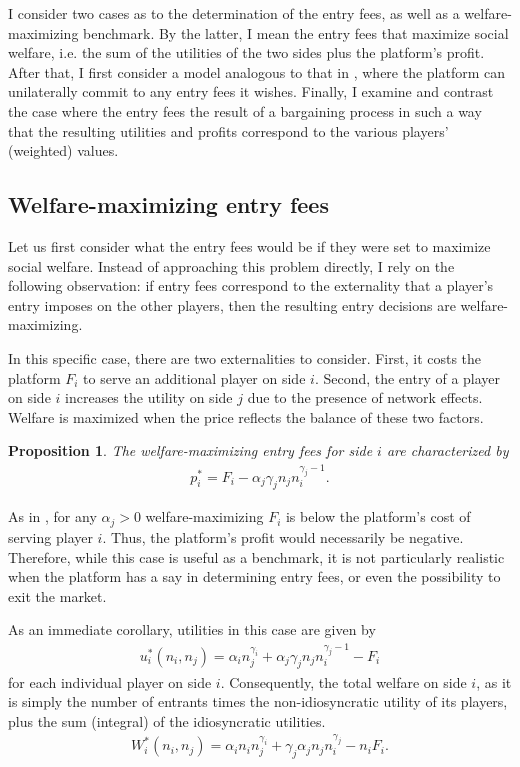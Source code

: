 \documentclass[a4paper]{article}
\newtheorem{proposition}{Proposition}
\begin{document}
I consider two cases as to the determination of the entry fees, as well as a welfare-maximizing benchmark.
By the latter, I mean the entry fees that maximize social welfare, i.e. the sum of the utilities of the two sides plus the platform's profit.
After that, I first consider a model analogous to that in \textcite{armstrong2006competition}, where the platform can unilaterally commit to any entry fees it wishes.
Finally, I examine and contrast the case where the entry fees the result of a bargaining process in such a way that the resulting utilities and profits correspond to the various players' (weighted) values.

\subsection{Welfare-maximizing entry fees}

Let us first consider what the entry fees would be if they were set to maximize social welfare.
Instead of approaching this problem directly, I rely on the following observation: if entry fees correspond to the externality that a player's entry imposes on the other players, then the resulting entry decisions are welfare-maximizing.

In this specific case, there are two externalities to consider.
First, it costs the platform $F_i$ to serve an additional player on side $i$.
Second, the entry of a player on side $i$ increases the utility on side $j$ due to the presence of network effects.
Welfare is maximized when the price reflects the balance of these two factors.
\begin{proposition}
    \label{prop:welfare_max_entry_fees}
    The welfare-maximizing entry fees for side $i$ are characterized by
    \begin{align*}
        p_i^* = F_i - \alpha_j \gamma_j n_j n_i^{\gamma_j - 1}.
    \end{align*}
\end{proposition}

As in \textcite{armstrong2006competition}, for any $\alpha_j > 0$ welfare-maximizing $F_i$ is below the platform's cost of serving player $i$.
Thus, the platform's profit would necessarily be negative.
Therefore, while this case is useful as a benchmark, it is not particularly realistic when the platform has a say in determining entry fees, or even the possibility to exit the market.

As an immediate corollary, utilities in this case are given by
\begin{align*}
    u_i^*(n_i, n_j) = \alpha_i n_j ^ {\gamma_i} + \alpha_j \gamma_j n_j n_i^{\gamma_j - 1} - F_i
\end{align*}
for each individual player on side $i$.
Consequently, the total welfare on side $i$, as it is simply the number of entrants times the non-idiosyncratic utility of its players, plus the sum (integral) of the idiosyncratic utilities.
\begin{align}
    W_i^*(n_i, n_j) = \alpha_i n_i n_j ^ {\gamma_i} + \gamma_j \alpha_j n_j n_i^{\gamma_j} - n_i F_i.
\end{align}
\end{document}
